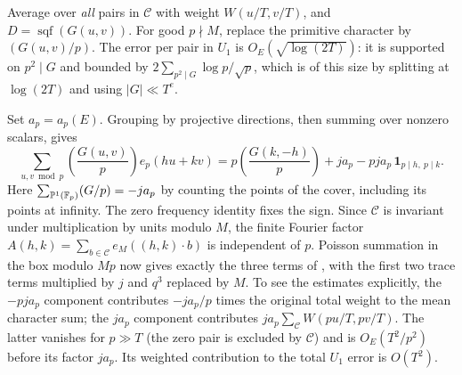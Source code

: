 \documentclass[11pt]{article}
\begin{document}
Average over \emph{all} pairs in $\mathcal C$ with weight $W(u/T,v/T)$, and $D=\operatorname{sqf}(G(u,v))$. For good $p\nmid M$, replace the primitive character by $(G(u,v)/p)$. The error per pair in $U_1$ is $O_E(\sqrt{\log(2T)})$: it is supported on $p^2\mid G$ and bounded by $2\sum_{p^2\mid G}\log p/\sqrt p$, which is of this size by splitting at $\log(2T)$ and using $|G|\ll T^e$.

Set $a_p=a_p(E)$. Grouping by projective directions, then summing over nonzero scalars, gives
\[
 \sum_{u,v\bmod p}\left(\frac{G(u,v)}p\right)e_p(hu+kv)
 =p\left(\frac{G(k,-h)}p\right)+j a_p
           -pj a_p\,\mathbf1_{p\mid h,\ p\mid k}.
\]
Here $\sum_{\mathbb P^1(\mathbb F_p)}(G/p)=-j a_p$ by counting the points of the cover, including its points at infinity. The zero frequency identity fixes the sign. Since $\mathcal C$ is invariant under multiplication by units modulo $M$, the finite Fourier factor $A(h,k)=\sum_{b\in\mathcal C}e_M((h,k)\cdot b)$ is independent of $p$. Poisson summation in the box modulo $Mp$ now gives exactly the three terms of \cite[eq.~(17)]{nacc}, with the first two trace terms multiplied by $j$ and $q^3$ replaced by $M$. To see the estimates explicitly, the $-pj a_p$ component contributes $-j a_p/p$ times the original total weight to the mean character sum; the $j a_p$ component contributes $j a_p\sum_{\mathcal C}W(pu/T,pv/T)$. The latter vanishes for $p\gg T$ (the zero pair is excluded by $\mathcal C$) and is $O_E(T^2/p^2)$ before its factor $j a_p$. Its weighted contribution to the total $U_1$ error is $O(T^2)$.
\end{document}
